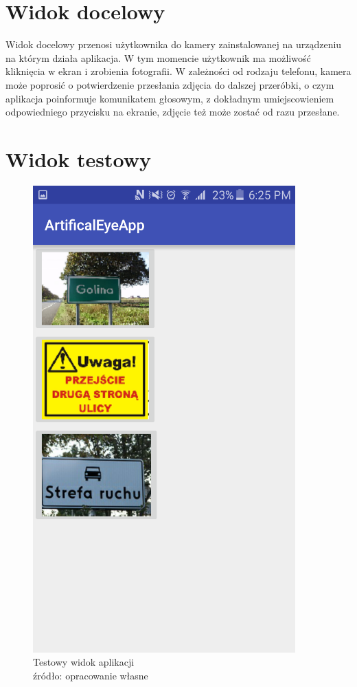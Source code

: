 \documentclass[eng,oneside]{mgr}
\begin{document}
\section{Widok docelowy}
Widok docelowy przenosi użytkownika do kamery zainstalowanej na urządzeniu na którym działa aplikacja. W tym momencie użytkownik ma możliwość kliknięcia w ekran i zrobienia fotografii. W zależności od rodzaju telefonu, kamera może poprosić o potwierdzenie przesłania zdjęcia do dalszej przeróbki, o czym aplikacja poinformuje komunikatem głosowym, z dokładnym umiejscowieniem odpowiedniego przycisku na ekranie, zdjęcie też może zostać od razu przesłane.
\section {Widok testowy}
\begin{figure}[htbp]
\centering
\includegraphics{widoktest.png}
\renewcommand\figurename{Przykład}
\caption{Testowy widok aplikacji
\\ 
źródło: opracowanie własne}\par\medskip

\end{figure}
\end{document}
